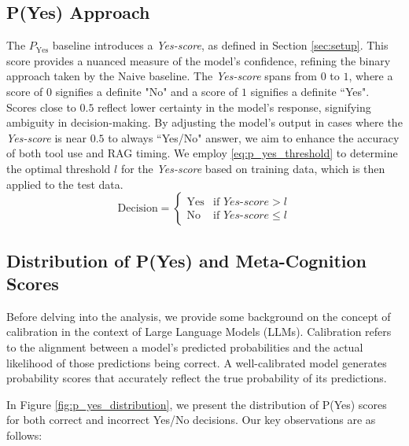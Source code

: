\subsection{P(Yes) Approach}\label{app:subsec:p_yes}
The $P_{\text{Yes}}$ baseline introduces a \textit{Yes-score}, as defined in Section \ref{sec:setup}. This score provides a nuanced measure of the model’s confidence, refining the binary approach taken by the Naive baseline. The \textit{Yes-score} spans from $0$ to $1$, where a score of $0$ signifies a definite "No" and a score of $1$ signifies a definite ``Yes". Scores close to $0.5$ reflect lower certainty in the model's response, signifying ambiguity in decision-making. By adjusting the model's output in cases where the \textit{Yes-score} is near $0.5$ to always ``Yes/No" answer, we aim to enhance the accuracy of both tool use and RAG timing. We employ \ref{eq:p_yes_threshold} to determine the optimal threshold $l$ for the \textit{Yes-score} based on training data, which is then applied to the test data.
\begin{equation}
\text{Decision} = 
\begin{cases} 
\text{Yes} & \text{if } \textit{Yes-score} > l \\
\text{No} & \text{if } \textit{Yes-score} \leq l 
\end{cases}
\label{eq:p_yes_threshold}
\end{equation}


\subsection{Distribution of P(Yes) and Meta-Cognition Scores}
Before delving into the analysis, we provide some background on the concept of calibration in the context of Large Language Models (LLMs). Calibration refers to the alignment between a model's predicted probabilities and the actual likelihood of those predictions being correct. A well-calibrated model generates probability scores that accurately reflect the true probability of its predictions.

In Figure \ref{fig:p_yes_distribution}, we present the distribution of P(Yes) scores for both correct and incorrect Yes/No decisions. Our key observations are as follows:

